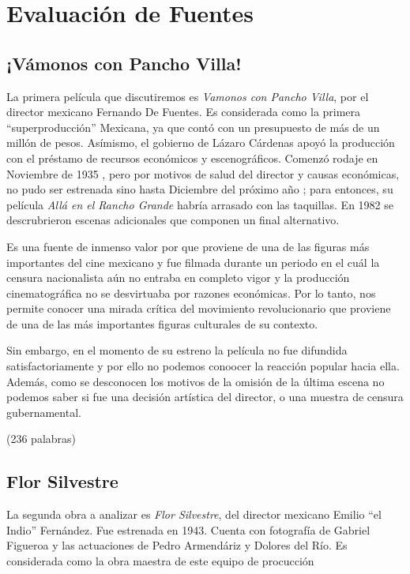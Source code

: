 \section{Evaluación de Fuentes}
\subsection{¡Vámonos con Pancho Villa!}
La primera película que discutiremos es \textit{Vamonos con Pancho Villa}\autocite{fernandez_vamonos_1936}, por el director mexicano Fernando De Fuentes. 
Es considerada como la primera ``superproducción'' Mexicana, ya que contó con un presupuesto de más de un millón de pesos.%
Asímismo, el gobierno de Lázaro Cárdenas apoyó la producción con el préstamo de recursos económicos%
y escenográficos.
Comenzó rodaje en Noviembre de 1935%
, pero por motivos de salud del director y causas económicas, no pudo ser estrenada sino hasta Diciembre del próximo año%
; para entonces, su película \textit{Allá en el Rancho Grande} habría arrasado con las taquillas. %
En 1982 se descrubrieron escenas adicionales que componen un final alternativo. 

Es una fuente de inmenso valor por que proviene de una de las figuras más importantes del cine mexicano y fue filmada durante un periodo en el cuál la censura nacionalista aún no entraba en completo vigor y la producción cinematográfica no se desvirtuaba por razones económicas.%
Por lo tanto, nos permite conocer una mirada crítica del movimiento revolucionario que proviene de una de las más importantes figuras culturales de su contexto. 

Sin embargo, en el momento de su estreno %
la película no fue difundida satisfactoriamente y por ello no podemos conoocer la reacción popular hacia ella. Además, como se desconocen los motivos de la omisión de la última escena no podemos saber si fue una  decisión artística del director, o una muestra de censura gubernamental.




(236 palabras)
\subsection{Flor Silvestre}
La segunda obra a analizar es \textit{Flor Silvestre}, del director mexicano
Emilio ``el Indio'' Fernández. Fue estrenada en 1943. Cuenta con fotografía de
Gabriel Figueroa y las actuaciones de Pedro Armendáriz y Dolores del Río. 
Es considerada como la obra maestra de este equipo de procucción %


